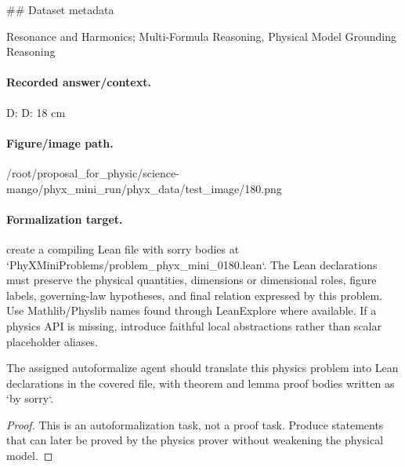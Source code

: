 \#\# Dataset metadata

Resonance and Harmonics; Multi-Formula Reasoning, Physical Model Grounding Reasoning

\paragraph{Recorded answer/context.}
D: D: 18 cm

\paragraph{Figure/image path.}
/root/proposal\_for\_physic/science-mango/phyx\_mini\_run/phyx\_data/test\_image/180.png

\paragraph{Formalization target.}
create a compiling Lean file with sorry bodies at `PhyXMiniProblems/problem\_phyx\_mini\_0180.lean`. The Lean declarations must preserve the physical quantities, dimensions or dimensional roles, figure labels, governing-law hypotheses, and final relation expressed by this problem.
Use Mathlib/Physlib names found through LeanExplore where available. If a physics API is missing, introduce faithful local abstractions rather than scalar placeholder aliases.

\begin{theorem}
\label{thm:physics:phyx_mini_0180:target}
The assigned autoformalize agent should translate this physics problem into Lean declarations in the covered file, with theorem and lemma proof bodies written as `by sorry`.
\end{theorem}
\begin{proof}
This is an autoformalization task, not a proof task. Produce statements that can later be proved by the physics prover without weakening the physical model.
\end{proof}

